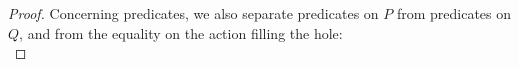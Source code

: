 \documentclass{lmcs}
\newcommand{\shortotimes}{\!\otimes\!}
\begin{document}
\begin{proof}
Concerning predicates, we also separate predicates on $P$ from predicates on $Q$, and from the equality on the action filling the hole:\\



\end{proof}
\end{document}
